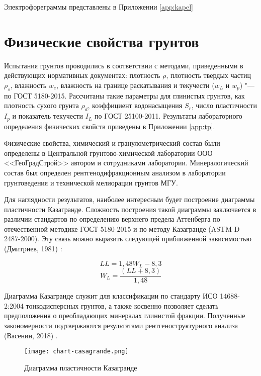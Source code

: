 Электрофореграммы представлены в Приложении \ref{app:kapel}


\section{Физические свойства грунтов}

Испытания грунтов проводились в соответствии с методами, приведенными в действующих нормативных документах:
плотность $\rho$, 
плотность твердых частиц $\rho_s$, 
влажность $w_e$, 
влажность на границе раскатывания и текучести ($w_L$ и $w_p$) "--- по ГОСТ 5180-2015. 
Рассчитаны такие параметры для глинистых грунтов, как
плотность сухого грунта $\rho_d$,  
коэффициент водонасыщения $S_r$, 
число пластичности $I_p$ 
и показатель текучести $I_L$ по ГОСТ 25100-2011.
Результаты лабораторного определения физических свойств приведены в Приложении \ref{app:tp}.



Физические свойства, химический и гранулометрический состав были определены в Центральной грунтово-химической лаборатории ООО <<ГеоГрадСтрой>> автором и сотрудниками лаборатории. Минералогический состав был определен рентгенодифракционным анализом в лаборатории грунтоведения и технической мелиорации грунтов МГУ.


Для наглядности результатов, наиболее интересным будет построение диаграммы пластичности Казагранде. Сложность построения такой диаграммы заключается в различии  стандартов по определению верхнего предела Аттенберга по отечественной методике ГОСТ 5180-2015 и по методу Казагранде (ASTM D 2487-2000). Эту связь можно выразить следующей приближенной зависимостью (Дмитриев, 1981) \cite{dmitriev1981}:

$$LL = 1,48W_L - 8,3$$
$$W_L = {\frac{(LL + 8,3)}{1,48}}$$

Диаграмма Казагранде служит для классификации по стандарту ИСО 14688-2:2004 тонкодисперсных грунтов, а также косвенно позволяет сделать предположения о преобладающих минералах глинистой фракции. Полученные закономерности подтвержаются результатами рентгеноструктурного анализа (Васенин, 2018) \cite{vasenin2018}.


\begin{figure}[ht]
    \small
    \centering
    \texttt{[image: chart-casagrande.png]}
    \caption{Диаграмма пластичности Казагранде} \label{Fig:Caz}
  \end{figure}


